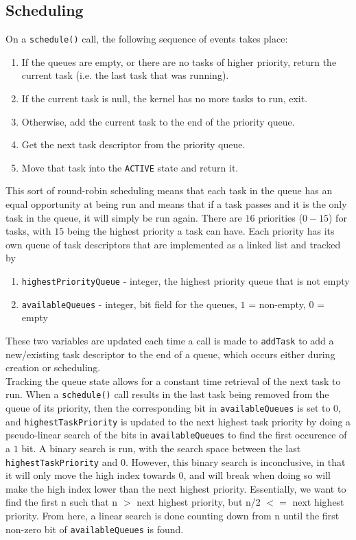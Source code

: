 \documentclass[12pt]{article}
\begin{document}
\subsection{Scheduling}
On a \texttt{schedule()} call, the following sequence of events takes place:
\begin{enumerate}
  \item If the queues are empty, or there are no tasks of higher priority, return the current task (i.e. the last task that was running).
  \item If the current task is null, the kernel has no more tasks to run, exit.
  \item Otherwise, add the current task to the end of the priority queue.
  \item Get the next task descriptor from the priority queue.
  \item Move that task into the \texttt{ACTIVE} state and return it.
\end{enumerate}
This sort of round-robin scheduling means that each task in the queue has an equal opportunity at being run and means that if a task passes and it is the only task in the queue, it will simply be run again.  There are $16$ priorities ($0 - 15$) for tasks, with $15$ being the highest priority a task can have.  Each priority has its own queue of task descriptors that are implemented as a linked list and tracked by
\begin{enumerate}
  \item \texttt{highestPriorityQueue} - integer, the highest priority queue that is not empty
  \item \texttt{availableQueues} - integer, bit field for the queues, $1$ = non-empty, $0$ = empty
\end{enumerate}
These two variables are updated each time a call is made to \texttt{addTask} to add a new/existing task descriptor to the end of a queue, which occurs either during creation or scheduling.\\

Tracking the queue state allows for a constant time retrieval of the next task to run.  When a \texttt{schedule()} call results in the last task being removed from the queue of its priority, then the corresponding bit in \texttt{availableQueues} is set to $0$, and \texttt{highestTaskPriority} is updated to the next highest task priority by doing a pseudo-linear search of the bits in \texttt{availableQueues} to find the first occurence of a $1$ bit.  A binary search is run, with the search space between the last \texttt{highestTaskPriority} and $0$.  However, this binary search is inconclusive, in that it will only move the high index towards 0, and will break when doing so will make the high index lower than the next highest priority. Essentially, we want to find the first n such that n $>$ next highest priority, but n/2 $<=$ next highest priority. From here, a linear search is done counting down from n until the first non-zero bit of \texttt{availableQueues} is found. \\
\end{document}
